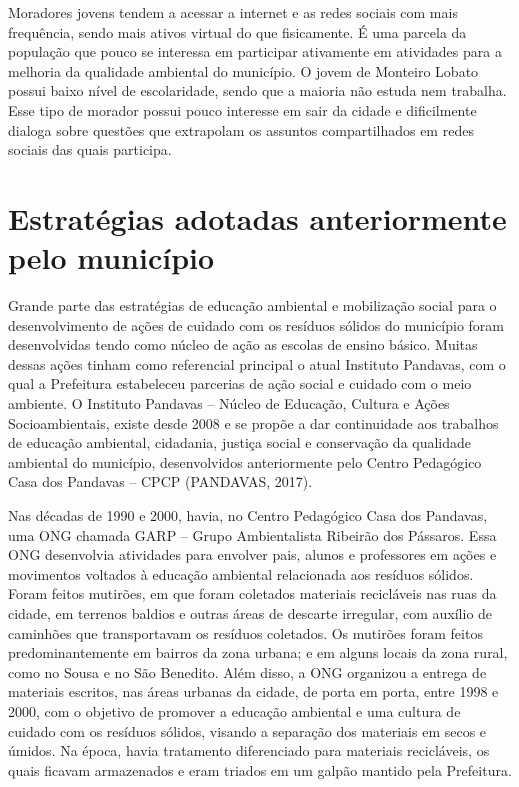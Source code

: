 Moradores jovens tendem a acessar a internet e as redes sociais com mais frequência, sendo mais ativos virtual do que fisicamente. É uma parcela da população que pouco se interessa em participar ativamente em atividades para a melhoria da qualidade ambiental do município. O jovem de Monteiro Lobato possui baixo nível de escolaridade, sendo que a maioria não estuda nem trabalha. Esse tipo de morador possui pouco interesse em sair da cidade e dificilmente dialoga sobre questões que extrapolam os assuntos compartilhados em redes sociais das quais participa.

\section{Estratégias adotadas anteriormente pelo município}

Grande parte das estratégias de educação ambiental e mobilização social para o desenvolvimento de ações de cuidado com os resíduos sólidos do município foram desenvolvidas tendo como núcleo de ação as escolas de ensino básico. Muitas dessas ações tinham como referencial principal o atual Instituto Pandavas, com o qual a Prefeitura estabeleceu parcerias de ação social e cuidado com o meio ambiente. O Instituto Pandavas – Núcleo de Educação, Cultura e Ações Socioambientais, existe desde 2008 e se propõe a dar continuidade aos trabalhos de educação ambiental, cidadania, justiça social e conservação da qualidade ambiental do município, desenvolvidos anteriormente pelo Centro Pedagógico Casa dos Pandavas – CPCP (PANDAVAS, 2017).

Nas décadas de 1990 e 2000, havia, no Centro Pedagógico Casa dos Pandavas, uma ONG chamada GARP – Grupo Ambientalista Ribeirão dos Pássaros. Essa ONG desenvolvia atividades para envolver pais, alunos e professores em ações e movimentos voltados à educação ambiental relacionada aos resíduos sólidos. Foram feitos mutirões, em que foram coletados materiais recicláveis nas ruas da cidade, em terrenos baldios e outras áreas de descarte irregular, com auxílio de caminhões que transportavam os resíduos coletados. Os mutirões foram feitos predominantemente em bairros da zona urbana; e em alguns locais da zona rural, como no Sousa e no São Benedito. Além disso, a ONG organizou a entrega de materiais escritos, nas áreas urbanas da cidade, de porta em porta, entre 1998 e 2000, com o objetivo de promover a educação ambiental e uma cultura de cuidado com os resíduos sólidos, visando a separação dos materiais em secos e úmidos. Na época, havia tratamento diferenciado para materiais recicláveis, os quais ficavam armazenados e eram triados em um galpão mantido pela Prefeitura.

